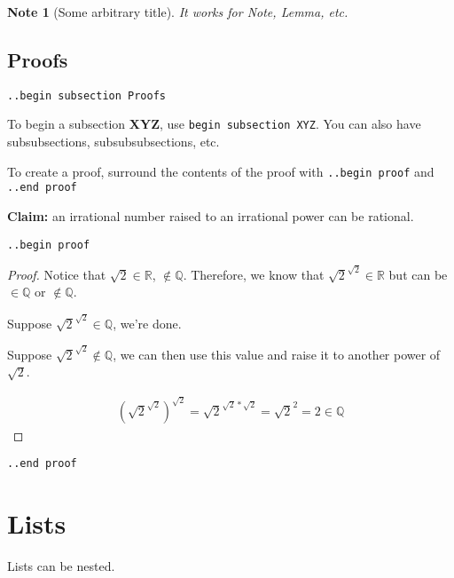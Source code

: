 \documentclass[12pt]{article}
\newtheorem{Note}[Lemma]{Note}
\begin{document}
\begin{flushleft}
\begin{Note}[Some arbitrary title]
It works for \emph{Note}, \emph{Lemma}, etc.
\end{Note}

\newpage

\subsection*{Proofs}
\verb|..begin subsection Proofs|

To begin a subsection \textbf{XYZ}, use \verb|begin subsection XYZ|. You can also have subsubsections, subsubsubsections, etc.

To create a proof, surround the contents of the proof with \verb|..begin proof| and \verb|..end proof|

\bigskip

\textbf{Claim:} an irrational number raised to an irrational power can be rational.

\medskip
\verb|..begin proof|
\begin{proof}

Notice that $\sqrt{2} \in \mathbb{R}$, $\notin \mathbb{Q}$. Therefore, we know that $\sqrt{2}^{\sqrt{2}} \in \mathbb{R}$ but can be $\in \mathbb{Q}$ or $\notin \mathbb{Q}$.

Suppose $\sqrt{2}^{\sqrt{2}} \in \mathbb{Q}$, we're done.

Suppose $\sqrt{2}^{\sqrt{2}} \notin \mathbb{Q}$, we can then use this value and raise it to another power of $\sqrt{2}$.

\begin{gather*}
(\sqrt{2}^{\sqrt{2}})^{\sqrt{2}} = \sqrt{2}^{\sqrt{2} * \sqrt{2}} = \sqrt{2}^2 = 2 \in \mathbb{Q} 
\end{gather*}
\end{proof}
\verb|..end proof|

\newpage

\section*{Lists}

Lists can be nested.


\end{flushleft}
\end{document}
